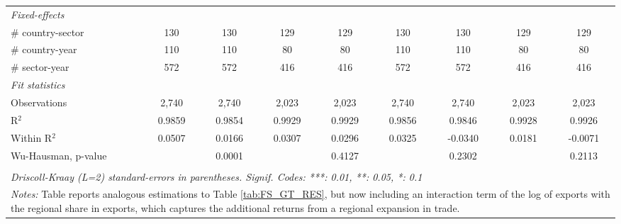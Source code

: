 \documentclass[a4paper]{article}
\begin{document}
\begin{table}[h!]
{\begin{tabular}{lcccccccc}
      \midrule
      \emph{Fixed-effects}\\
      \# country-sector                              & 130            & 130                    & 129            & 129                     & 130            & 130                    & 129            & 129\\  
      \# country-year                                & 110            & 110                    & 80             & 80                      & 110            & 110                    & 80             & 80\\  
      \# sector-year                                 & 572            & 572                    & 416            & 416                     & 572            & 572                    & 416            & 416\\ 
            \midrule
      \emph{Fit statistics}\\
      Observations                                   & 2,740          & 2,740                  & 2,023          & 2,023                   & 2,740          & 2,740                  & 2,023          & 2,023\\  
      R$^2$                                          & 0.9859         & 0.9854                 & 0.9929         & 0.9929                  & 0.9856         & 0.9846                 & 0.9928         & 0.9926\\  
      Within R$^2$                                   & 0.0507         & 0.0166                 & 0.0307         & 0.0296                  & 0.0325         & -0.0340                & 0.0181         & -0.0071\\  
      Wu-Hausman, p-value                            &                & 0.0001                 &                & 0.4127                  &                & 0.2302                 &                & 0.2113\\
      \bottomrule \\ [-0.9em]
      \multicolumn{9}{l}{\emph{Driscoll-Kraay (L=2) standard-errors in parentheses. Signif. Codes: ***: 0.01, **: 0.05, *: 0.1}}\\
      \multicolumn{9}{l}{\parbox{1.19\textwidth}{\scriptsize
\textit{Notes:} Table reports analogous estimations to Table \ref{tab:FS_GT_RES}, but now including an interaction term of the log of exports with the regional share in exports, which captures the additional returns from a regional expansion in trade. }}
   \end{tabular}
   }
\end{table}
\FloatBarrier
\end{document}

